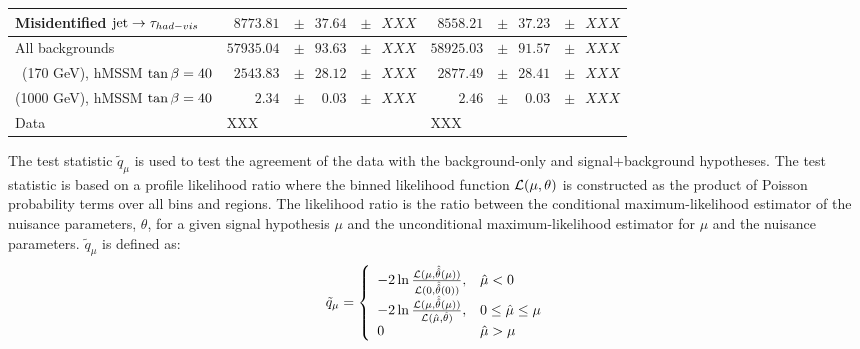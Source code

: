 \begin{table}
\begin{center}
{\begin{tabular}{l|l|l}
			Misidentified $\mbox{jet} \to \tau_{had-vis}$ &   $\phantom{0}8773.81\phantom{.0}\pm\phantom{0}37.64\phantom{.0}\pm\phantom{0}XXX$ & $\phantom{0}8558.21\phantom{.0}\pm\phantom{0}37.23\phantom{.0}\pm\phantom{0}XXX$ \\
			\hline
			All backgrounds   &  $57935.04\phantom{.0}\pm\phantom{0} 93.63\phantom{.0}\pm\phantom{0} XXX$ & $58925.03\phantom{.0}\pm\phantom{0} 91.57\phantom{.0}\pm\phantom{0} XXX$ \\
			\hline
			\Hpm $\phantom{0}$(170 GeV), hMSSM $\tan\beta=40$ & $\phantom{0}2543.83\phantom{.0}\pm\phantom{0}28.12\phantom{.0}\pm\phantom{0}XXX$ & $\phantom{0}2877.49\phantom{.0}\pm\phantom{0}28.41\phantom{.0}\pm\phantom{0}XXX$ \\
			\Hpm (1000 GeV), hMSSM $\tan\beta=40$ &   $\phantom{0000}2.34\phantom{0.}\pm\phantom{00}0.03\phantom{0.}\pm\phantom{0}XXX$ & $\phantom{0000}2.46\phantom{0.}\pm\phantom{00}0.03\phantom{0.}\pm\phantom{0}XXX$ \\
			\hline
			Data         &     XXX &  XXX  \\
			\hline
			\end{tabular}}
			\end{center}
		\end{table}

		The test statistic $\tilde{q}_{\mu}$ \cite{test-statistic} is used to test the agreement of the data with the background-only and signal+background hypotheses. The test statistic is based on a profile likelihood ratio where the binned likelihood function $\cal{L}(\mu,\theta)$ is constructed as the product of Poisson probability terms over all bins and regions. The likelihood ratio is the ratio between the conditional maximum-likelihood estimator of the nuisance parameters, $\theta$, for a given signal hypothesis $\mu$ and the unconditional maximum-likelihood estimator for $\mu$ and the nuisance parameters. $\tilde{q}_{\mu}$ is defined as:
		\begin{equation}
		\tilde{q}_{\mu} = \left\{
		\begin{array}{ll}
		-2\ln\frac{{\cal L}(\mu, \hat{\hat{\theta}}(\mu))}{{\cal L}(0, \hat{\hat{\theta}}(0))}, & \hat{\mu} < 0 \\
		-2\ln\frac{{\cal L}(\mu, \hat{\hat{\theta}}(\mu))}{{\cal L}(\hat{\mu}, \hat{\theta})}, & 0 \leq \hat{\mu} \leq \mu \\
		0 & \hat{\mu} > \mu 
		\end{array}
		\right.
		\end{equation}

